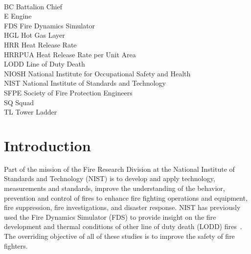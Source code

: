 \documentclass[11pt,oneside]{book}
\begin{document}
\begin{tabbing}
\hspace{1.5in} \= \\
BC \> Battalion Chief \\
E \> Engine \\
FDS \> Fire Dynamics Simulator \\
HGL \> Hot Gas Layer \\
HRR \> Heat Release Rate \\
HRRPUA \> Heat Release Rate per Unit Area \\
LODD \> Line of Duty Death \\
NIOSH \> National Institute for Occupational Safety and  Health \\
NIST \> National Institute of Standards and Technology \\
SFPE \> Society of Fire Protection Engineers \\
SQ \> Squad \\
TL \> Tower Ladder \\
\end{tabbing}

\mainmatter

\chapter{Introduction}
Part of the mission of the Fire Research Division at the National Institute of Standards and Technology (NIST) is to develop and apply technology, measurements and standards, improve the understanding of the behavior, prevention and control of fires to enhance fire fighting operations and equipment, fire suppression, fire investigations, and disaster response. NIST has previously used the Fire Dynamics Simulator (FDS) to provide insight on the fire development and thermal conditions of other line of duty death (LODD) fires~\cite{Madrzykowski:1,Iowa,Texas,Cook_County,Grosshandler:Station,Bryner:Charleston,barowy:texas}. The overriding objective of all of these studies is to improve the safety of fire fighters.
\end{document}
